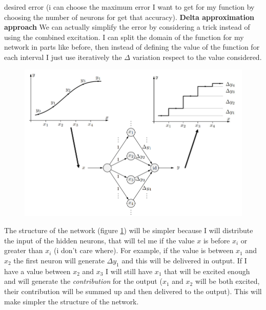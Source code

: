 \documentclass{article}
\begin{document}
desired error (i can choose the maximum error I want to get for my
function by choosing the number of neurons for get that accuracy).\newline\newline
\noindent\textbf{Delta approximation approach}\newline\noindent
We can actually simplify the error by considering a trick instead of using the
combined excitation.
\newline\newline
I can split the domain of the function for my network in parts like before,
then instead of defining the value of the function for each interval I just
use iteratively the $\Delta$ variation respect to the value considered.
\begin{figure}[H]
    \centering
    \caption{}
    \includegraphics[scale=0.5]{images/multi-delta-integra.png}
    \label{fig:integra_delta}
\end{figure}
The structure of the network (figure \ref{fig:integra_delta}) will be simpler
because I will distribute the input of the hidden neurons,
that will tel me if the value $x$ is before $x_i$ or greater than $x_i$ (i don't care where).
\newline\newline
For example, if the value is between $x_1$ and $x_2$ the first neuron
will generate $\Delta y_1$ and this will be delivered in output.
\newline\newline
If I have a value between $x_2$ and $x_3$ I will still have $x_1$ that
will be excited enough and will generate the \textit{contribution}
for the output ($x_1$ and $x_2$ will be both excited, their
contribution will be summed up and then delivered to the output).
\newline\newline
This will make simpler the structure of the network.
\end{document}
